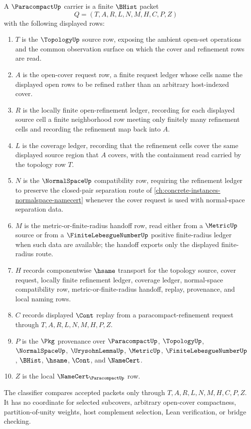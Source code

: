 \begin{definition}
\label{def:paracompact-carrier}
A $\ParacompactUp$ carrier is a finite $\BHist$ packet
$$
Q=(T,A,R,L,N,M,H,C,P,Z)
$$
with the following displayed rows:
\begin{enumerate}
\item $T$ is the $\TopologyUp$ source row, exposing the ambient open-set operations and the common observation surface on which the cover and refinement rows are read.
\item $A$ is the open-cover request row, a finite request ledger whose cells name the displayed open rows to be refined rather than an arbitrary host-indexed cover.
\item $R$ is the locally finite open-refinement ledger, recording for each displayed source cell a finite neighborhood row meeting only finitely many refinement cells and recording the refinement map back into $A$.
\item $L$ is the coverage ledger, recording that the refinement cells cover the same displayed source region that $A$ covers, with the containment read carried by the topology row $T$.
\item $N$ is the $\NormalSpaceUp$ compatibility row, requiring the refinement ledger to preserve the closed-pair separation route of \autoref{ch:concrete-instances-normalspace-namecert} whenever the cover request is used with normal-space separation data.
\item $M$ is the metric-or-finite-radius handoff row, read either from a $\MetricUp$ source or from a $\FiniteLebesgueNumberUp$ positive finite-radius ledger when such data are available; the handoff exports only the displayed finite-radius route.
\item $H$ records componentwise $\hsame$ transport for the topology source, cover request, locally finite refinement ledger, coverage ledger, normal-space compatibility row, metric-or-finite-radius handoff, replay, provenance, and local naming rows.
\item $C$ records displayed $\Cont$ replay from a paracompact-refinement request through $T,A,R,L,N,M,H,P,Z$.
\item $P$ is the $\Pkg$ provenance over $\ParacompactUp$, $\TopologyUp$, $\NormalSpaceUp$, $\UrysohnLemmaUp$, $\MetricUp$, $\FiniteLebesgueNumberUp$, $\BHist$, $\hsame$, $\Cont$, and $\NameCert$.
\item $Z$ is the local $\NameCert_{\ParacompactUp}$ row.
\end{enumerate}
The classifier compares accepted packets only through $T,A,R,L,N,M,H,C,P,Z$. It has no coordinate for selected subcovers, arbitrary open-cover compactness, partition-of-unity weights, host complement selection, Lean verification, or bridge checking.
\end{definition}

